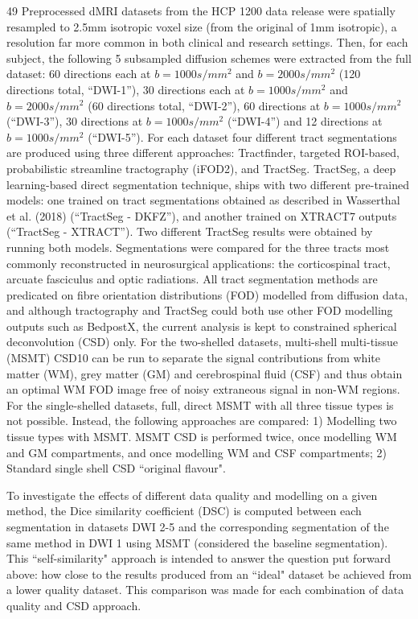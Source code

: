 49 Preprocessed dMRI datasets from the HCP 1200 data release were spatially resampled to 2.5mm isotropic voxel size (from the original of 1mm isotropic), a resolution far more common in both clinical and research settings.
Then, for each subject, the following 5 subsampled diffusion schemes were extracted from the full dataset:
60 directions each at $b=1000s/mm^2$ and $b=2000s/mm^2$ (120 directions total, ``DWI-1”), 30 directions each at $b=1000s/mm^2$ and $b=2000s/mm^2$ (60 directions total, ``DWI-2”), 60 directions at $b=1000s/mm^2$ (``DWI-3”), 30 directions at $b=1000s/mm^2$ (``DWI-4”) and 12 directions at $b=1000s/mm^2$ (``DWI-5”).
For each dataset four different tract segmentations are produced using three different approaches: Tractfinder, targeted ROI-based, probabilistic streamline tractography (iFOD2), and TractSeg.
TractSeg, a deep learning-based direct segmentation technique, ships with two different pre-trained models:
one trained on tract segmentations obtained as described in Wasserthal et al. (2018) (``TractSeg - DKFZ”), and another trained on XTRACT7 outputs (``TractSeg - XTRACT”).
Two different TractSeg results were obtained by running both models.
Segmentations were compared for the three tracts most commonly reconstructed in neurosurgical applications: the corticospinal tract, arcuate fasciculus and optic radiations.
All tract segmentation methods are predicated on fibre orientation distributions (FOD) modelled from diffusion data, and although tractography and TractSeg could both use other FOD modelling outputs such as BedpostX, the current analysis is kept to constrained spherical deconvolution (CSD) only.
For the two-shelled datasets, multi-shell multi-tissue (MSMT) CSD10 can be run to separate the signal contributions from white matter (WM), grey matter (GM) and cerebrospinal fluid (CSF) and thus obtain an optimal WM FOD image free of noisy extraneous signal in non-WM regions.
For the single-shelled datasets, full, direct MSMT with all three tissue types is not possible.
Instead, the following approaches are compared: 1) Modelling two tissue types with MSMT.
MSMT CSD is performed twice, once modelling WM and GM compartments, and once modelling WM and CSF compartments; 2) Standard single shell CSD ``original flavour".

To investigate the effects of different data quality and modelling on a given method, the Dice similarity coefficient (DSC) is computed between each segmentation in datasets DWI 2-5 and the corresponding segmentation of the same method in DWI 1 using MSMT (considered the baseline segmentation).
This ``self-similarity" approach is intended to answer the question put forward above: how close to the results produced from an ``ideal" dataset be achieved from a lower quality dataset.
This comparison was made for each combination of data quality and CSD approach.

